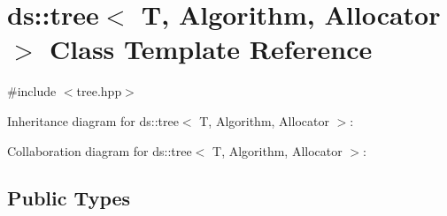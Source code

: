 \hypertarget{classds_1_1tree}{}\section{ds\+:\+:tree$<$ T, Algorithm, Allocator $>$ Class Template Reference}
\label{classds_1_1tree}


{\ttfamily \#include $<$tree.\+hpp$>$}



Inheritance diagram for ds\+:\+:tree$<$ T, Algorithm, Allocator $>$\+:


Collaboration diagram for ds\+:\+:tree$<$ T, Algorithm, Allocator $>$\+:
\subsection*{Public Types}
